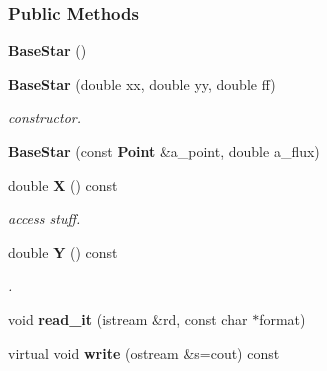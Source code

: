 \subsubsection*{Public Methods}
\begin{CompactItemize}
\item 
{}
{\bf Base\-Star} ()\label{class_basestar_a0}

\item 
{}
{\bf Base\-Star} (double xx, double yy, double ff)\label{class_basestar_a1}

\begin{CompactList}\small\item\em constructor.\item\end{CompactList}\item 
{}
{\bf Base\-Star} (const {\bf Point} \&a\_\-point, double a\_\-flux)\label{class_basestar_a2}

\item 
{}
double {\bf X} () const\label{class_basestar_a3}

\begin{CompactList}\small\item\em access stuff.\item\end{CompactList}\item 
{}
double {\bf Y} () const\label{class_basestar_a4}

\begin{CompactList}\small\item\em .\item\end{CompactList}\item 
{}
void {\bf read\_\-it} (istream \&rd, const char $\ast$format)\label{class_basestar_a5}

\item 
{}
virtual void {\bf write} (ostream \&s=cout) const\label{class_basestar_a6}


\end{CompactItemize}
